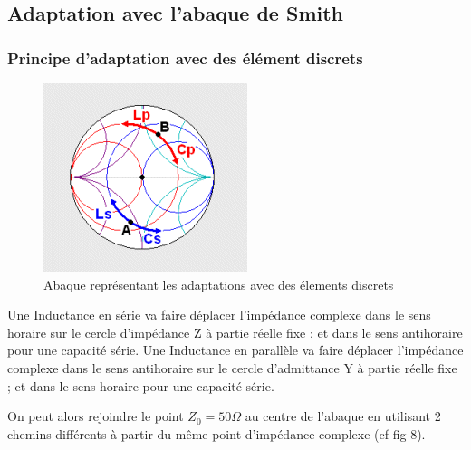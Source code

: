 \documentclass[a4paper]{article}
\begin{document}
\subsection{Adaptation avec l'abaque de Smith}
\subsubsection{Principe d'adaptation avec des \'el\'ement discrets}

\begin{figure}[!htb]
\begin{center}
  \includegraphics[scale=0.65]{adaptation_elements.png}
  \caption{Abaque repr\'esentant les adaptations avec des \'elements discrets\cite{conception-adaptation}}
\end{center}
\end{figure}

Une Inductance en s\'erie va faire d\'eplacer l'imp\'edance complexe dans le sens horaire sur le cercle d'imp\'edance Z \`a partie r\'eelle fixe ; et dans le sens antihoraire pour une capacit\'e s\'erie.
Une Inductance en parall\`ele  va faire d\'eplacer l'imp\'edance complexe dans le sens antihoraire sur le cercle d'admittance Y \`a partie r\'eelle fixe ; et dans le sens horaire pour une capacit\'e s\'erie.

On peut alors rejoindre le point $Z_0 = 50 \Omega$ au centre de l'abaque en utilisant 2 chemins diff\'erents \`a partir du m\^eme point d'imp\'edance complexe (cf fig 8).
\end{document}
